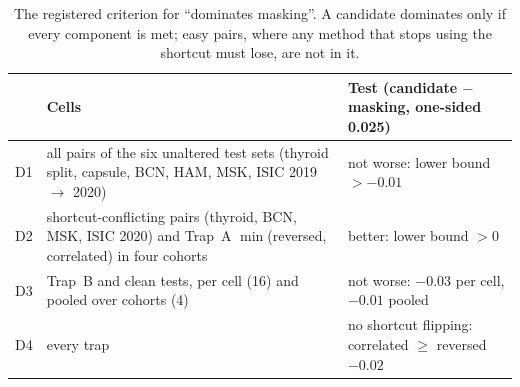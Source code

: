 \begin{table}[H]\centering\scriptsize
\caption{The registered criterion for ``dominates masking''. A candidate dominates only if every component is met; easy pairs, where any method that stops using the shortcut must lose, are not in it.}\label{tab:s17crit}
\begin{tabular}{lp{9.0cm}p{5.0cm}}\toprule
 & Cells & Test (candidate $-$ masking, one-sided 0.025) \\\midrule
D1 & all pairs of the six unaltered test sets (thyroid split, capsule, BCN, HAM, MSK, ISIC 2019 $\to$ 2020) & not worse: lower bound $>-0.01$ \\
D2 & shortcut-conflicting pairs (thyroid, BCN, MSK, ISIC 2020) and Trap~A $\min$(reversed, correlated) in four cohorts & better: lower bound $>0$ \\
D3 & Trap~B and clean tests, per cell (16) and pooled over cohorts (4) & not worse: $-0.03$ per cell, $-0.01$ pooled \\
D4 & every trap & no shortcut flipping: correlated $\ge$ reversed $-0.02$ \\
\bottomrule\end{tabular}
\end{table}
